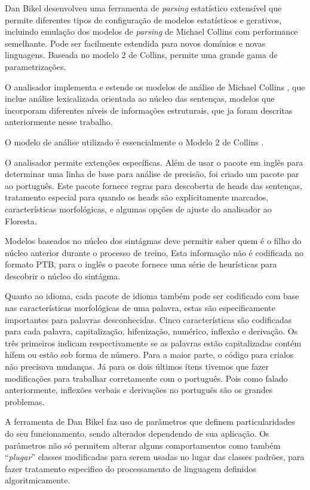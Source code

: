 Dan Bikel desenvolveu uma ferramenta de \emph{parsing} estatístico extensível que permite diferentes tipos de configuração de modelos estatísticos e gerativos, incluindo emulação dos modelos de \emph{parsing} de Michael Collins com performance semelhante. Pode ser facilmente estendida para novos domínios e novas linguagens. Baseada no modelo 2 de Collins, permite uma grande gama de parametrizações.

O analisador implementa e estende os modelos de análise de Michael Collins \cite{collins99}, que inclue análise lexicalizada orientada ao núcleo das sentenças, modelos que incorporam diferentes níveis de informações estruturais, que ja foram descritas anteriormente nesse trabalho.

O modelo de análise utilizado é essencialmente o Modelo 2 de Collins \cite{collins99}.

O analisador permite extenções específicas. Além de usar o pacote em inglês para determinar uma linha de base para análise de precisão, foi criado um pacote par ao português. Este pacote fornece regras para descoberta de heads das sentenças, tratamento especial para quando os heads são explicitamente marcados, características morfológicas, e algumas opções de ajuste do analisador ao Floresta.

Modelos baseados no núcleo dos sintágmas deve permitir saber quem é o filho do núcleo anterior durante o processo de treino, Esta informação não é codificada no formato PTB, para o inglês o pacote fornece uma série de heurísticas para descobrir o núcleo do sintágma.

Quanto ao idioma, cada pacote de idioma também pode ser codificado com base nas características morfológicas de uma palavra, estas são especificamente importantes para palavras desconhecidas. Cinco características são codificadas para cada palavra, capitalização, hifenização, numérico, inflexão e derivação. Os três primeiros indicam respectivamente se as palavras estão capitalizadas contém hífem ou estão sob forma de número. Para a maior parte, o código para crialos não precisava mudanças. Já para os dois últimos ítens tivemos que fazer modificações para trabalhar corretamente com o português. Pois como falado anteriormente, inflexões verbais e derivações no português são os grandes problemas.

A ferramenta de Dan Bikel faz uso de parâmetros que definem particularidades do seu funcionamento, sendo alterados dependendo de sua aplicação. Os parâmetros não só permitem alterar alguns comportamentos como também ``\emph{plugar}'' classes modificadas para serem usadas no lugar das classes padrões, para fazer tratamento especifico do processamento de linguagem definidos algoritmicamente.

